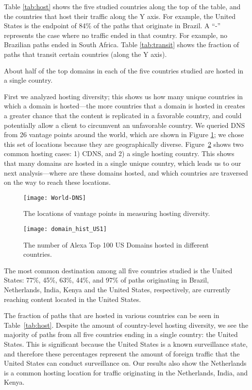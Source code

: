 Table \ref{tab:host} shows the five studied countries along the top of the table, and the countries that host their traffic along the Y axis.  For example, the United States is the endpoint of 84\% of the paths that originate in Brazil.  A ``-'' represents the case where no traffic ended in that country.  For example, no Brazilian paths ended in South Africa. Table \ref{tab:transit} shows the fraction of paths that transit certain countries (along the Y axis).

\begin{finding}
About half of the top domains in each of the five countries studied are hosted in a single country.
\end{finding}
First we analyzed hosting diversity; this shows us how many unique countries in which a domain is hosted---the more countries that a domain is hosted in creates a greater chance that the content is replicated in a favorable country, and could potentially allow a client to circumvent an unfavorable country.  We queried DNS from 26 vantage points around the world, which are shown in Figure \ref{fig:world}; we chose this set of locations because they are geographically diverse.  Figure~\ref{fig:host_diversity} shows two common hosting cases: 1) CDNS, and 2) a single hosting country.  This shows that many domains are hosted in a single unique country, which leads us to our next analysis---where are these domains hosted, and which countries are traversed on the way to reach these locations.

\begin{figure}[t]
\centering
\texttt{[image: World-DNS]}
\caption{The locations of vantage points in measuring hosting diversity.}
\label{fig:world}
\end{figure}

\begin{figure}[t]
\centering
\texttt{[image: domain\_hist\_US1]}
\caption{The number of Alexa Top 100 US Domains hosted in different countries.}
\label{fig:host_diversity}
\end{figure}

\begin{finding}
The most common destination among all five countries studied is the United States: 77\%, 45\%, 63\%, 44\%, and 97\% of paths originating in Brazil, Netherlands, India, Kenya and the United States, respectively, are currently reaching content located in the United States.
\end{finding}
The fraction of paths that are hosted in various countries can be seen in Table~\ref{tab:host}.  Despite the amount of country-level hosting diversity, we see the majority of paths from all five countries ending in a single country: the United States.  This is significant because the United States is a known surveillance state, and therefore these percentages represent the amount of foreign traffic that the United States can conduct surveillance on.  Our results also show the Netherlands is a common hosting location for traffic originating in the Netherlands, India, and Kenya.

